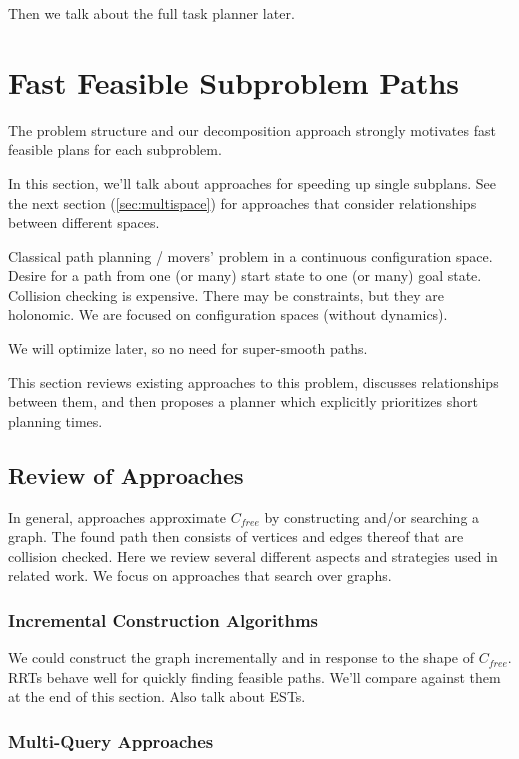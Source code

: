\documentclass{article}
\begin{document}
Then we talk about the full task planner later.


\newpage
\section{Fast Feasible Subproblem Paths}
\label{sec:inflate}

The problem structure and our decomposition approach
strongly motivates fast feasible plans
for each subproblem.

In this section, we'll talk about approaches for speeding up
single subplans.
See the next section (\ref{sec:multispace})
for approaches that consider relationships between different spaces.

Classical path planning / movers' problem in a continuous configuration space.
Desire for a path from one (or many) start state to one (or many) goal state.
Collision checking is expensive.
There may be constraints, but they are holonomic.
We are focused on configuration spaces (without dynamics).

We will optimize later, so no need for super-smooth paths.

This section reviews existing approaches to this problem,
discusses relationships between them,
and then proposes a planner which explicitly prioritizes short planning times.

\subsection{Review of Approaches}

In general, approaches approximate $C_{free}$ by constructing and/or
searching a graph.
The found path then consists of vertices and edges thereof that are collision
checked.
Here we review several different aspects and strategies used in related work.
We focus on approaches that search over graphs.

\subsubsection{Incremental Construction Algorithms}

We could construct the graph incrementally and in response to the shape
of $C_{free}$.
RRTs behave well for quickly finding feasible paths.
We'll compare against them at the end of this section.
Also talk about ESTs.

\subsubsection{Multi-Query Approaches}
\end{document}
